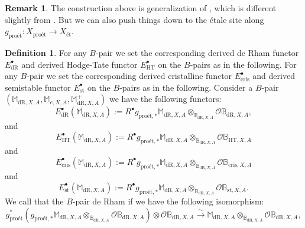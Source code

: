 \documentclass[12pt]{amsart}
\theoremstyle{definition}
\newtheorem{definition}[theorem]{Definition}
\newtheorem{remark}[theorem]{Remark}
\numberwithin{equation}{section}
\begin{document}
\begin{remark}
The construction above is generalization of \cite[Definition 8.6.5]{KL16}, which is different slightly from \cite[Section 3.2]{LZ}. But we can also push things down to the \'etale site along $g_\text{pro\'et}:X_\text{pro\'et}\rightarrow X_\text{\'et}$.	
\end{remark}



\begin{definition} 
For any $B$-pair we set the corresponding derived de Rham functor $E^\bullet_{\mathrm{dR}}$ and derived Hodge-Tate functor $E^\bullet_{\mathrm{HT}}$ on the $B$-pairs as in the following.
For any $B$-pair we set the corresponding derived cristalline functor $E^\bullet_{\mathrm{cris}}$ and derived semistable functor $E^\bullet_{\mathrm{st}}$ on the $B$-pairs as in the following. Consider a $B$-pair $(\mathbb{M}_{\mathrm{dR},X,A}, \mathbb{M}_{e,X,A}, \mathbb{M}^+_{\mathrm{dR},X,A})$ we have the following functors:
\begin{displaymath}
E_{\mathrm{dR}}^\bullet(\mathbb{M}_{\mathrm{dR},X,A}):=R^\bullet g_{\text{pro\'et},*} \mathbb{M}_{\mathrm{dR},X,A}\otimes_{\mathbb{B}_{\mathrm{dR},X,A}}	 \mathcal{O}\mathbb{B}_{\mathrm{dR},X,A},
\end{displaymath}
and
\begin{displaymath}
E_{\mathrm{HT}}^\bullet(\mathbb{M}_{\mathrm{dR},X,A}):=R^\bullet g_{\text{pro\'et},*} \mathbb{M}_{\mathrm{dR},X,A}\otimes_{\mathbb{B}_{\mathrm{dR},X,A}}	 \mathcal{O}\mathbb{B}_{\mathrm{HT},X,A}
\end{displaymath}
and
\begin{displaymath}
E_{\mathrm{cris}}^\bullet(\mathbb{M}_{\mathrm{dR},X,A}):=R^\bullet g_{\text{pro\'et},*} \mathbb{M}_{\mathrm{dR},X,A}\otimes_{\mathbb{B}_{\mathrm{dR},X,A}}	 \mathcal{O}\mathbb{B}_{\mathrm{cris},X,A}
\end{displaymath}
and
\begin{displaymath}
E_{\mathrm{st}}^\bullet(\mathbb{M}_{\mathrm{dR},X,A}):=R^\bullet g_{\text{pro\'et},*} \mathbb{M}_{\mathrm{dR},X,A}\otimes_{\mathbb{B}_{\mathrm{dR},X,A}}	 \mathcal{O}\mathbb{B}_{\mathrm{st},X,A}.
\end{displaymath}
We call that the $B$-pair de Rham if we have the following isomorphism:
\begin{displaymath}
g^*_\text{pro\'et}(g_{\text{pro\'et},*} \mathbb{M}_{\mathrm{dR},X,A}\otimes_{\mathbb{B}_{\mathrm{dR},X,A}}	 \mathcal{O}\mathbb{B}_{\mathrm{dR},X,A})\otimes\mathcal{O}\mathbb{B}_{\mathrm{dR},X,A} \overset{\sim}{\rightarrow} \mathbb{M}_{\mathrm{dR},X,A}\otimes_{\mathbb{B}_{\mathrm{dR},X,A}}	 \mathcal{O}\mathbb{B}_{\mathrm{dR},X,A},

\end{displaymath}
\end{definition}
\end{document}
